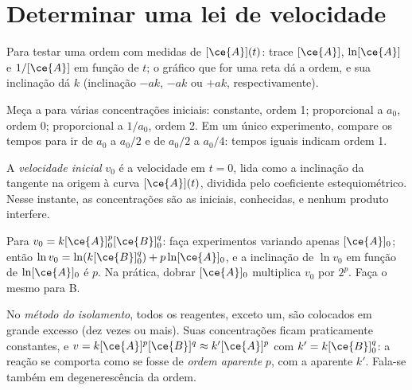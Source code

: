 \section{Determinar uma lei de velocidade}

\begin{method}\label{met:b1:rate-laws:integral}
Para testar uma ordem com medidas de $[\ce{A}](t)$: trace $[\ce{A}]$,
$\ln[\ce{A}]$ e $1/[\ce{A}]$ em função de $t$; o gráfico que for uma reta
dá a ordem, e sua inclinação dá $k$ (inclinação $-ak$, $-ak$ ou $+ak$,
respectivamente).
\end{method}

\begin{method}\label{met:b1:rate-laws:half-life}
Meça a  para várias concentrações iniciais: constante, ordem 1;
proporcional a $a_0$, ordem 0; proporcional a $1/a_0$, ordem 2. Em um
único experimento, compare os tempos para ir de $a_0$ a $a_0/2$ e de
$a_0/2$ a $a_0/4$: tempos iguais indicam ordem 1.
\end{method}

\begin{definition}\label{def:b1:rate-laws:initial-rate}
A \emph{velocidade inicial} $v_0$ é a velocidade
em $t = 0$, lida como a inclinação da tangente na origem à curva
$[\ce{A}](t)$, dividida pelo coeficiente estequiométrico. Nesse instante,
as concentrações são as iniciais, conhecidas, e nenhum produto interfere.
\end{definition}

\begin{method}\label{met:b1:rate-laws:initial-rates}
Para $v_0 = k[\ce{A}]_0^p[\ce{B}]_0^q$: faça experimentos variando apenas
$[\ce{A}]_0$; então $\ln v_0 = \ln(k[\ce{B}]_0^q) + p\ln[\ce{A}]_0$, e a
inclinação de $\ln v_0$ em função de $\ln[\ce{A}]_0$ é $p$. Na prática,
dobrar $[\ce{A}]_0$ multiplica $v_0$ por $2^p$. Faça o mesmo para B.
\end{method}

\begin{definition}\label{def:b1:rate-laws:apparent-order}
No \emph{método do isolamento}, todos os reagentes,
exceto um, são colocados em grande excesso (dez vezes ou mais). Suas
concentrações ficam praticamente constantes, e $v = k[\ce{A}]^p[\ce{B}]^q \approx k'[\ce{A}]^p$
com $k' = k[\ce{B}]_0^q$: a reação se comporta como se fosse de
\emph{ordem aparente} $p$, com a  aparente $k'$. Fala-se também em degenerescência da ordem.
\end{definition}

